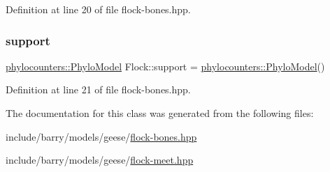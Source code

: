 Definition at line 20 of file flock-\/bones.\+hpp.

\mbox{\label{class_flock_a20d75da0d423252055af84194e88f901}} 
\subsubsection{\texorpdfstring{support}{support}}
{\footnotesize\ttfamily \hyperlink{namespacebarry_1_1counters_1_1phylo_ad32b4186e3bab93119df225fddc3c609}{phylocounters\+::\+Phylo\+Model} Flock\+::support = \hyperlink{namespacebarry_1_1counters_1_1phylo_ad32b4186e3bab93119df225fddc3c609}{phylocounters\+::\+Phylo\+Model}()}



Definition at line 21 of file flock-\/bones.\+hpp.



The documentation for this class was generated from the following files\+:\begin{DoxyCompactItemize}
\item 
include/barry/models/geese/\hyperlink{flock-bones_8hpp}{flock-\/bones.\+hpp}\item 
include/barry/models/geese/\hyperlink{flock-meet_8hpp}{flock-\/meet.\+hpp}\end{DoxyCompactItemize}
